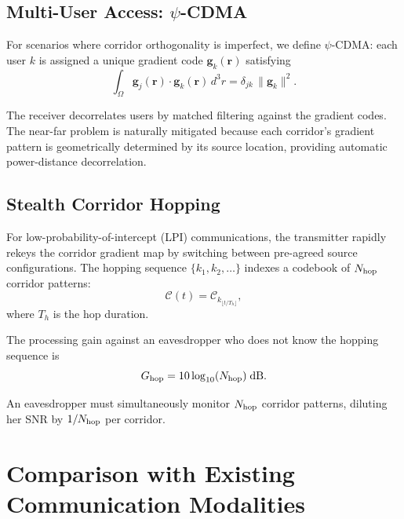\documentclass[twocolumn,superscriptaddress,prd,nofootinbib]{revtex4-2}
\newcommand{\Corridor}{\mathcal{C}}
\begin{document}
\subsection{Multi-User Access: $\psi$-CDMA}

For scenarios where corridor orthogonality is imperfect, we define
$\psi$-CDMA: each user $k$ is assigned a unique gradient code
$\mathbf{g}_k(\mathbf{r})$ satisfying
\begin{equation}
\int_\Omega \mathbf{g}_j(\mathbf{r}) \cdot \mathbf{g}_k(\mathbf{r})\,d^3r
= \delta_{jk}\,\|\mathbf{g}_k\|^2.
\label{eq:psi-CDMA}
\end{equation}

The receiver decorrelates users by matched filtering against the
gradient codes.
The near-far problem is naturally mitigated because each corridor's
gradient pattern is geometrically determined by its source location,
providing automatic power-distance decorrelation.

\subsection{Stealth Corridor Hopping}

For low-probability-of-intercept (LPI) communications, the transmitter
rapidly rekeys the corridor gradient map by switching between
pre-agreed source configurations.
The hopping sequence $\{k_1, k_2, \ldots\}$ indexes a codebook of
$N_{\rm hop}$ corridor patterns:
\begin{equation}
\Corridor(t) = \Corridor_{k_{\lfloor t/T_h\rfloor}},
\label{eq:hopping}
\end{equation}
where $T_h$ is the hop duration.

The processing gain against an eavesdropper who does not know the
hopping sequence is
\begin{equation}
G_{\rm hop} = 10\log_{10}(N_{\rm hop})\;\text{dB}.
\label{eq:hopping-gain}
\end{equation}

An eavesdropper must simultaneously monitor $N_{\rm hop}$ corridor
patterns, diluting her SNR by $1/N_{\rm hop}$ per corridor.

\section{Comparison with Existing Communication Modalities}
\label{sec:comparison}
\end{document}
